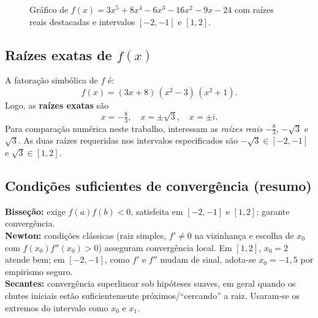 \documentclass[12pt,a4paper]{article}
\begin{document}
\begin{figure}[H]
\centering
{}
\caption{Gráfico de $f(x)=3x^{5}+8x^{4}-6x^{3}-16x^{2}-9x-24$ com raízes reais destacadas e intervalos $[-2,-1]$ e $[1,2]$.}
\label{fig:grafico}
\end{figure}

\subsection{Raízes exatas de $f(x)$}
A fatoração simbólica de $f$ é:
\[
f(x)=(3x+8)\,(x^{2}-3)\,(x^{2}+1).
\]
Logo, as \textbf{raízes exatas} são
\[
x=-\tfrac{8}{3},\quad x=\pm \sqrt{3},\quad x=\pm i.
\]
Para comparação numérica neste trabalho, interessam as \emph{raízes reais} $-\tfrac{8}{3}$, $-\sqrt{3}$ e $\sqrt{3}$.
As duas raízes requeridas nos intervalos especificados são $-\sqrt{3}\in[-2,-1]$ e $\sqrt{3}\in[1,2]$.

\subsection{Condições suficientes de convergência (resumo)}
\textbf{Bisseção:} exige $f(a)f(b)<0$, satisfeita em $[-2,-1]$ e $[1,2]$; garante convergência.
\\
\textbf{Newton:} condições clássicas (raiz simples, $f'\neq 0$ na vizinhança e escolha de $x_0$ com $f(x_0)f''(x_0)>0$) asseguram convergência local. Em $[1,2]$, $x_0=2$ atende bem; em $[-2,-1]$, como $f'$ e $f''$ mudam de sinal, adota-se $x_0=-1{,}5$ por empirismo seguro.
\\
\textbf{Secantes:} convergência superlinear sob hipóteses suaves, em geral quando os chutes iniciais estão suficientemente próximos/“cercando” a raiz. Usaram-se os extremos do intervalo como $x_0$ e $x_1$.
\end{document}
